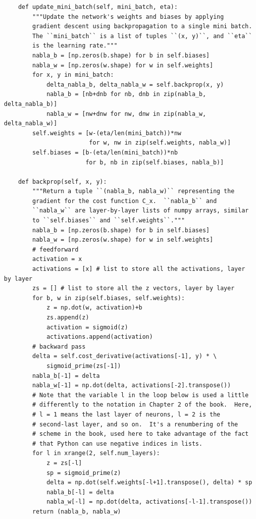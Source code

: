 \begin{lstlisting}
    def update_mini_batch(self, mini_batch, eta):
        """Update the network's weights and biases by applying
        gradient descent using backpropagation to a single mini batch.
        The ``mini_batch`` is a list of tuples ``(x, y)``, and ``eta``
        is the learning rate."""
        nabla_b = [np.zeros(b.shape) for b in self.biases]
        nabla_w = [np.zeros(w.shape) for w in self.weights]
        for x, y in mini_batch:
            delta_nabla_b, delta_nabla_w = self.backprop(x, y)
            nabla_b = [nb+dnb for nb, dnb in zip(nabla_b, delta_nabla_b)]
            nabla_w = [nw+dnw for nw, dnw in zip(nabla_w, delta_nabla_w)]
        self.weights = [w-(eta/len(mini_batch))*nw
                        for w, nw in zip(self.weights, nabla_w)]
        self.biases = [b-(eta/len(mini_batch))*nb
                       for b, nb in zip(self.biases, nabla_b)]

    def backprop(self, x, y):
        """Return a tuple ``(nabla_b, nabla_w)`` representing the
        gradient for the cost function C_x.  ``nabla_b`` and
        ``nabla_w`` are layer-by-layer lists of numpy arrays, similar
        to ``self.biases`` and ``self.weights``."""
        nabla_b = [np.zeros(b.shape) for b in self.biases]
        nabla_w = [np.zeros(w.shape) for w in self.weights]
        # feedforward
        activation = x
        activations = [x] # list to store all the activations, layer by layer
        zs = [] # list to store all the z vectors, layer by layer
        for b, w in zip(self.biases, self.weights):
            z = np.dot(w, activation)+b
            zs.append(z)
            activation = sigmoid(z)
            activations.append(activation)
        # backward pass
        delta = self.cost_derivative(activations[-1], y) * \
            sigmoid_prime(zs[-1])
        nabla_b[-1] = delta
        nabla_w[-1] = np.dot(delta, activations[-2].transpose())
        # Note that the variable l in the loop below is used a little
        # differently to the notation in Chapter 2 of the book.  Here,
        # l = 1 means the last layer of neurons, l = 2 is the
        # second-last layer, and so on.  It's a renumbering of the
        # scheme in the book, used here to take advantage of the fact
        # that Python can use negative indices in lists.
        for l in xrange(2, self.num_layers):
            z = zs[-l]
            sp = sigmoid_prime(z)
            delta = np.dot(self.weights[-l+1].transpose(), delta) * sp
            nabla_b[-l] = delta
            nabla_w[-l] = np.dot(delta, activations[-l-1].transpose())
        return (nabla_b, nabla_w)


\end{lstlisting}
